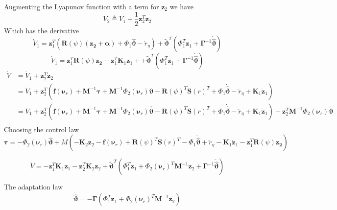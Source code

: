 \documentclass[12pt,a4]{article}
\begin{document}
Augmenting the Lyapunov function with a term for $\bm{z}_2$ we have
\begin{equation}
	V_2 \triangleq V_1 + \frac{1}{2}\bm{z}_2^T\bm{z}_2
\end{equation}
Which has the derivative
\begin{equation}
	\dot{V}_1 = \bm{z}_1^T\left( \bm{R}(\psi)(\bm{z_2} + \bm{\alpha})+ \Phi_1\bm{\hat{\vartheta}} - \dot{r}_{\eta} \right)
	+ \bm{\tilde{\vartheta}}^T \left(  \Phi_1^T\bm{z}_1 + \bm{\Gamma}^{-1}\bm{\dot{\hat{\vartheta}}} \right)
\end{equation}
\begin{equation}
	\dot{V}_1 = \bm{z}_1^T \bm{R}(\psi) \bm{z_2} - \bm{z}_1^T \bm{K}_1 \bm{z}_1 +
	+ \bm{\tilde{\vartheta}}^T \left(  \Phi_1^T\bm{z}_1 + \bm{\Gamma}^{-1}\bm{\dot{\hat{\vartheta}}} \right)
\end{equation}
\begin{align}
	\dot{V} & = \dot{V}_1 + \bm{z}_2^T\dot{\bm{z}}_2                                                                                           \\
	        & = \dot{V}_1 + \bm{z}_2^T \left(  \bm{f}(\bm{\nu}_r) + \bm{M}^{-1}\bm{\tau} + \bm{M}^{-1}\Phi_2 (\bm{\nu}_r )\bm{\vartheta}
	-\bm{R}(\psi)^T \bm{S}(r)^T + \Phi_1 \bm{\dot{\hat{\vartheta}}} - \ddot{r}_{\eta} + \bm{K}_1 \bm{\dot{z}}_1  \right)                       \\
	        & = \dot{V}_1 + \bm{z}_2^T \left(  \bm{f}(\bm{\nu}_r) + \bm{M}^{-1}\bm{\tau} + \bm{M}^{-1}\Phi_2 (\bm{\nu}_r )\bm{\hat{\vartheta}}
	-\bm{R}(\psi)^T \bm{S}(r)^T + \Phi_1 \bm{\dot{\hat{\vartheta}}} - \ddot{r}_{\eta} + \bm{K}_1 \bm{\dot{z}}_1  \right)     +
	\bm{z}_2^T \bm{M}^{-1}\Phi_2 (\bm{\nu}_r )\bm{\tilde{\vartheta}}
	\\
\end{align}
Choosing the control law
\begin{equation}
	\bm{\tau} = -\Phi_2 (\bm{\nu}_r )\bm{\hat{\vartheta}} + M \left( - \bm{K}_2 \bm{z}_2 -\bm{f}(\bm{\nu}_r) +\bm{R}(\psi)^T \bm{S}(r)^T - \Phi_1 \bm{\dot{\hat{\vartheta}}}
	+ \ddot{r}_{\eta} - \bm{K}_1 \bm{\dot{z}}_1    -\bm{z}_1^T \bm{R}(\psi) \bm{z_2}   \right)
\end{equation}

\begin{equation}
	\dot{V} =  - \bm{z}_1^T \bm{K}_1 \bm{z}_1 -  \bm{z}_2^T \bm{K}_2 \bm{z}_2 + \bm{\tilde{\vartheta}}^T \left(  \Phi_1^T\bm{z}_1 +  \Phi_2 (\bm{\nu}_r )^T\bm{M}^{-1}\bm{z}_2 + \bm{\Gamma}^{-1}\bm{\dot{\hat{\vartheta}}} \right)
\end{equation}

The adaptation law
\begin{equation}
	\bm{\dot{\hat{\vartheta}}} = - \bm{\Gamma} \left( \Phi_1^T\bm{z}_1 +  \Phi_2 (\bm{\nu}_r )^T\bm{M}^{-1}\bm{z}_2 \right)
\end{equation}
\end{document}

